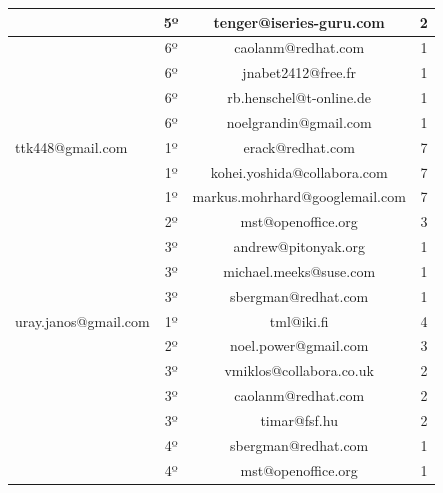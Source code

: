 \documentclass[oneside,brazil,a4paper]{normas-utf-tex}
\begin{document}
\begin{table}[hbt]
\begin{tabular}{|l|c|c|c|}
                                                & 5º & tenger@iseries-guru.com & 2\\\hline
                                                & 6º & caolanm@redhat.com & 1\\\hline
                                                & 6º & jnabet2412@free.fr & 1\\\hline
                                                & 6º & rb.henschel@t-online.de & 1\\\hline
                                                & 6º & noelgrandin@gmail.com & 1\\\hline
                    ttk448@gmail.com            & 1º & erack@redhat.com & 7\\\hline
                                                & 1º & kohei.yoshida@collabora.com & 7\\\hline
                                                & 1º & markus.mohrhard@googlemail.com & 7\\\hline
                                                & 2º & mst@openoffice.org & 3\\\hline
                                                & 3º & andrew@pitonyak.org & 1\\\hline
                                                & 3º & michael.meeks@suse.com & 1\\\hline
                                                & 3º & sbergman@redhat.com & 1 \\\hline
                    uray.janos@gmail.com        & 1º & tml@iki.fi & 4\\\hline
                                                & 2º & noel.power@gmail.com & 3\\\hline
                                                & 3º & vmiklos@collabora.co.uk & 2\\\hline
                                                & 3º &caolanm@redhat.com & 2\\\hline
                                                & 3º &timar@fsf.hu & 2\\\hline
                                                & 4º &sbergman@redhat.com & 1\\\hline
                                                & 4º &mst@openoffice.org & 1\\\hline

    \end{tabular}
\end{table}
\end{document}
